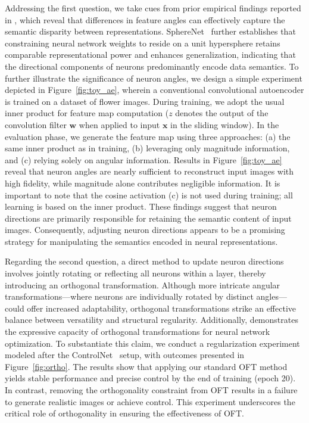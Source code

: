 Addressing the first question, we take cues from prior empirical findings reported in \cite{liu2018decoupled,chen2020angular}, which reveal that differences in feature angles can effectively capture the semantic disparity between representations. SphereNet~\cite{liu2017deep} further establishes that constraining neural network weights to reside on a unit hypersphere retains comparable representational power and enhances generalization, indicating that the directional components of neurons predominantly encode data semantics. To further illustrate the significance of neuron angles, we design a simple experiment depicted in Figure~\ref{fig:toy_ae}, wherein a conventional convolutional autoencoder is trained on a dataset of flower images. During training, we adopt the usual inner product for feature map computation ($z$ denotes the output of the convolution filter $\bm{w}$ when applied to input $\bm{x}$ in the sliding window). In the evaluation phase, we generate the feature map using three approaches: (a) the same inner product as in training, (b) leveraging only magnitude information, and (c) relying solely on angular information. Results in Figure~\ref{fig:toy_ae} reveal that neuron angles are nearly sufficient to reconstruct input images with high fidelity, while magnitude alone contributes negligible information. It is important to note that the cosine activation (c) is not used during training; all learning is based on the inner product. These findings suggest that neuron directions are primarily responsible for retaining the semantic content of input images. Consequently, adjusting neuron directions appears to be a promising strategy for manipulating the semantics encoded in neural representations.

Regarding the second question, a direct method to update neuron directions involves jointly rotating or reflecting all neurons within a layer, thereby introducing an orthogonal transformation. Although more intricate angular transformations—where neurons are individually rotated by distinct angles—could offer increased adaptability, orthogonal transformations strike an effective balance between versatility and structural regularity. Additionally, \cite{liu2021orthogonal} demonstrates the expressive capacity of orthogonal transformations for neural network optimization. To substantiate this claim, we conduct a regularization experiment modeled after the ControlNet~\cite{zhang2023adding} setup, with outcomes presented in Figure~\ref{fig:ortho}. The results show that applying our standard OFT method yields stable performance and precise control by the end of training (epoch 20). In contrast, removing the orthogonality constraint from OFT results in a failure to generate realistic images or achieve control. This experiment underscores the critical role of orthogonality in ensuring the effectiveness of OFT.


